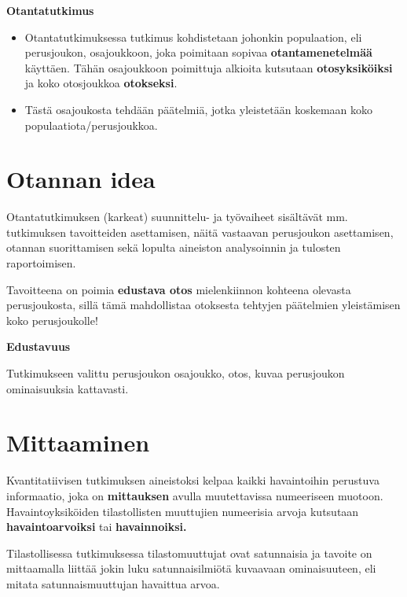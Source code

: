 \documentclass[
]{report}
\begin{document}
\begin{defblock}{}

\textbf{Otantatutkimus}

\begin{itemize}
\item
  Otantatutkimuksessa tutkimus kohdistetaan johonkin populaation, eli
  perusjoukon, osajoukkoon, joka poimitaan sopivaa
  \textbf{otantamenetelmää} käyttäen. Tähän osajoukkoon poimittuja
  alkioita kutsutaan \textbf{otosyksiköiksi} ja koko otosjoukkoa
  \textbf{otokseksi}.
\item
  Tästä osajoukosta tehdään päätelmiä, jotka yleistetään koskemaan koko
  populaatiota/perusjoukkoa.
\end{itemize}

\end{defblock}

\hypertarget{otannan-idea}{%
\section{Otannan idea}\label{otannan-idea}}

Otantatutkimuksen (karkeat) suunnittelu- ja työvaiheet sisältävät mm.
tutkimuksen tavoitteiden asettamisen, näitä vastaavan perusjoukon
asettamisen, otannan suorittamisen sekä lopulta aineiston analysoinnin
ja tulosten raportoimisen.

Tavoitteena on poimia \textbf{edustava otos} mielenkiinnon kohteena
olevasta perusjoukosta, sillä tämä mahdollistaa otoksesta tehtyjen
päätelmien yleistämisen koko perusjoukolle!

\begin{defblock}{}
\textbf{Edustavuus}

Tutkimukseen valittu perusjoukon osajoukko, otos, kuvaa perusjoukon
ominaisuuksia kattavasti.

\end{defblock}

\hypertarget{mittaaminen}{%
\section{Mittaaminen}\label{mittaaminen}}

Kvantitatiivisen tutkimuksen aineistoksi kelpaa kaikki havaintoihin
perustuva informaatio, joka on \textbf{mittauksen} avulla muutettavissa
numeeriseen muotoon. Havaintoyksiköiden tilastollisten muuttujien
numeerisia arvoja kutsutaan \textbf{havaintoarvoiksi} tai
\textbf{havainnoiksi.}

Tilastollisessa tutkimuksessa tilastomuuttujat ovat satunnaisia ja
tavoite on mittaamalla liittää jokin luku satunnaisilmiötä kuvaavaan
ominaisuuteen, eli mitata satunnaismuuttujan havaittua arvoa.
\end{document}

